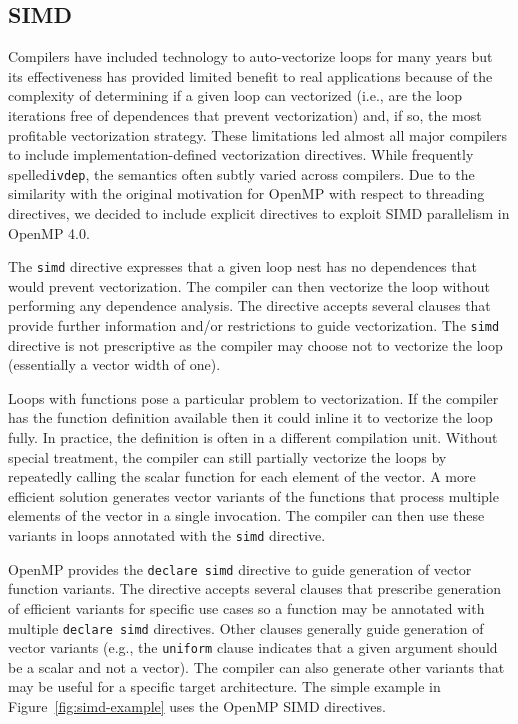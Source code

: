\subsection{SIMD}
\label{sub:simd}

Compilers have included technology to auto-vectorize loops for many years 
but its effectiveness has provided limited benefit to real applications 
because of the complexity of determining if a given loop can vectorized 
(i.e., are the loop iterations free of dependences that prevent vectorization)
and, if so, the most profitable vectorization strategy. These limitations
led almost all major compilers to include implementation-defined 
vectorization directives. While frequently spelled\texttt{ivdep}, the
semantics often subtly varied across compilers. Due to the similarity 
with the original motivation for OpenMP with respect to threading 
directives, we decided to  include explicit directives to exploit 
SIMD parallelism in OpenMP 4.0.

The \texttt{simd} directive expresses that a given loop nest has no
dependences that would prevent vectorization. The compiler can then 
vectorize the loop without performing any dependence analysis. The 
directive accepts several clauses that provide further information 
and/or restrictions to guide vectorization. The \texttt{simd} directive 
is not prescriptive as the compiler may choose not to vectorize the 
loop (essentially a vector width of one).

Loops with functions pose a particular problem to vectorization. If the 
compiler has the function definition available then it could inline it 
to vectorize the loop fully. In practice, the definition is often in a
different compilation unit. Without special treatment, the compiler can
still partially vectorize the loops by repeatedly calling the scalar 
function for each element of the vector. A more efficient solution 
generates vector variants of the functions that process multiple 
elements of the vector in a single invocation. The compiler can then
use these variants in loops annotated with the \texttt{simd} directive.

OpenMP provides the \texttt{declare simd} directive to guide generation
of vector function variants. The directive accepts several clauses that
prescribe generation of efficient variants for specific use cases so a
function may be annotated with multiple \texttt{declare simd} directives.
Other clauses generally guide generation of vector variants (e.g., the 
\texttt{uniform} clause indicates that a given argument should be a 
scalar and not a vector). The compiler can also generate other variants 
that may be useful for a specific target architecture. The simple example 
in Figure~\ref{fig:simd-example} uses the OpenMP SIMD directives.

